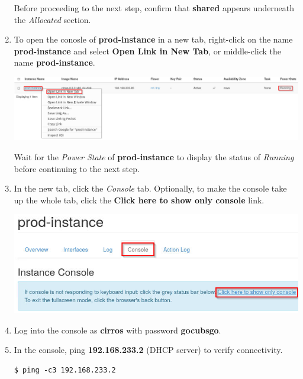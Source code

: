 \documentclass[letterpaper, 12pt]{article}
\begin{document}
\begin{enumerate}
    \begin{stopbox}{}
        Before proceeding to the next step, confirm that \textbf{shared} appears underneath the \textit{Allocated}
        section.
    \end{stopbox}

    \item To open the conosle of \textbf{prod-instance} in a new tab, right-click on the name \textbf{prod-instance} and
    select \textbf{Open Link in New Tab}, or middle-click the name \textbf{prod-instance}.

    \begin{center}
        \includegraphics[width=\linewidth]{images/part_1_step_14.png}
    \end{center}

    \begin{stopbox}{}
        Wait for the \textit{Power State} of \textbf{prod-instance} to display the status of \textit{Running} before
        continuing to the next step.
    \end{stopbox}

    \item In the new tab, click the \textit{Console} tab. Optionally, to make the console take up the whole tab, click
    the \textbf{Click here to show only console} link.
    
    \begin{center}
        \includegraphics[width=\linewidth]{images/part_1_step_15.png}
    \end{center}

    \item Log into the console as \textbf{cirros} with password \textbf{gocubsgo}.

    \item In the console, ping \textbf{192.168.233.2} (DHCP server) to verify connectivity.
\begin{lstlisting}
$ ping -c3 192.168.233.2
\end{lstlisting}


\end{enumerate}
\end{document}
